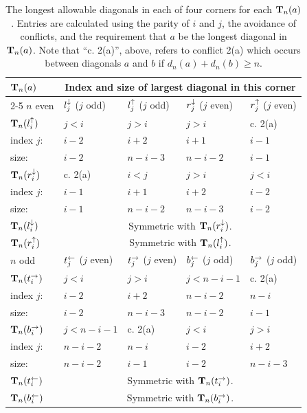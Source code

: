 
\begin{table}[h]
  \label{tab:cases}
  \centering

  \begin{tabular}[h]{lllll}
    $\mathbf T_{n}(a)$ &\multicolumn{4}{c}{Index and size of largest diagonal in this corner}\\
    \cline{2-5}
    $n$ even & $l_{j}^\downarrow$ ($j$ odd)& $l_{j}^\uparrow$ ($j$ odd)& $r_{j}^\downarrow$ ($j$ even) & $r_{j}^\uparrow$ ($j$ even)\\
    \hline
    $\mathbf T_{n}(l_{i}^\uparrow)$& $j < i$ & $j>i$ & $j >i$ & c. 2(a)\\
    index $j$:& $ i-2$ & $i+2$ &$i+1$ & $i-1$\\
    \rowcolor{lightgrey}  size: & $i-2$ & $n-i-3$ & $n-i-2$ & $i-1$\\
    $\mathbf T_{n}(r_{i}^\downarrow)$ & c. 2(a) &$i<j$ & $j>i$ & $j<i$\\
    index $j$:& $i-1$ & $i+1$&$i+2$ & $i-2$ \\
    \rowcolor{lightgrey} size: &  $i-1$ & $n-i-2$&$n-i-3$& $i-2$\\
    $\mathbf T_{n}(l_{i}^\downarrow)$ & \multicolumn{4}{c}{Symmetric with $\mathbf T_{n}(r_{i}^\downarrow)$.}\\
    $\mathbf T_{n}(r_{i}^\uparrow)$ & \multicolumn{4}{c}{Symmetric with $\mathbf T_{n}(l_{i}^\uparrow)$.}\\
    \hline
    \hline
    $n$ odd & $t_{j}^\leftarrow$ ($j$ even) & $t_{j}^\rightarrow$ ($j$ even)& $b_{j}^\leftarrow$ ($j$ odd)& $b_{j}^\rightarrow$ ($j$ odd) \\
    \hline
    $\mathbf T_{n}(t_{i}^\rightarrow)$& $j < i$ & $j>i$ & $j < n-i-1$ & c. 2(a)\\
    index $j$:& $ i-2$ & $i+2$ &$n-i-2$ & $n-i$\\

    \rowcolor{lightgrey}  size: & $i-2$ & $n-i-3$ & $n-i-2$ & $i-1$\\
    $\mathbf T_{n}(b_{i}^\rightarrow)$ & $j < n-i-1$ &c. 2(a) & $j<i$ & $j>i$\\
    index $j$:&  $n-i-2$&$n-i$ &$i-2$ & $i+2$ \\
    \rowcolor{lightgrey}    size: &  $n-i-2$&$i-1$ & $i-2$& $n-i-3$\\
    $\mathbf T_{n}(t_{i}^\leftarrow)$ & \multicolumn{4}{c}{Symmetric with $\mathbf T_{n}(t_{i}^\rightarrow)$.}\\
    $\mathbf T_{n}(b_{i}^\leftarrow)$ & \multicolumn{4}{c}{Symmetric with $\mathbf T_{n}(b_{i}^\rightarrow)$.}\\
    \hline
  \end{tabular}

  \caption{The longest allowable diagonals in each of four corners for each $\mathbf T_{n}(a)$.  Entries are calculated using the parity of $i$ and $j$, the avoidance of conflicts, and the requirement that $a$ be the longest diagonal in $\mathbf T_{n}(a)$. Note that ``c. 2(a)'', above, refers to conflict 2(a) which occurs between diagonals $a$ and $b$ if $d_n(a) + d_n(b) \ge n$.}
  \label{tab:tnnnCases}
\end{table}

